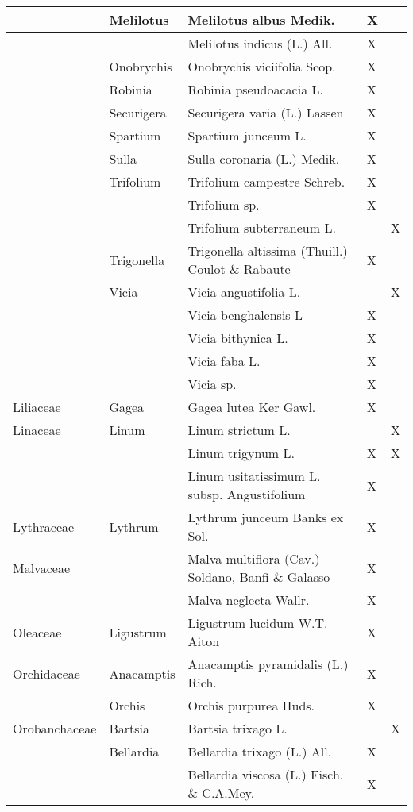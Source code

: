 \documentclass[main.tex]{subfiles}
\begin{document}
\begin{table}[!ht]
\begin{tabular}[\footnotesize]{|p{2.4cm}|p{1.9cm}|p{5.8cm}|p{1.1cm}|p{1cm}|}
        ~ & Melilotus & Melilotus albus Medik. & X & ~ \\ \hline
        ~ & ~ & Melilotus indicus (L.) All. & X & ~ \\ \hline
        ~ & Onobrychis & Onobrychis viciifolia Scop. & X & ~ \\ \hline
        ~ & Robinia & Robinia pseudoacacia L. & X & ~ \\ \hline
        ~ & Securigera & Securigera varia (L.) Lassen & X & ~ \\ \hline
        ~ & Spartium & Spartium junceum L. & X & ~ \\ \hline
        ~ & Sulla & Sulla coronaria (L.) Medik. & X & ~ \\ \hline
        ~ & Trifolium & Trifolium campestre Schreb. & X & ~ \\ \hline
        ~ & ~ & Trifolium sp. & X & ~ \\ \hline
        ~ & ~ & Trifolium subterraneum L. & ~ & X \\ \hline
        ~ & Trigonella & Trigonella altissima (Thuill.) Coulot \& Rabaute & X & ~ \\ \hline
        ~ & Vicia & Vicia angustifolia L. & ~ & X \\ \hline
        ~ & ~ & Vicia benghalensis L & X & ~ \\ \hline
        ~ & ~ & Vicia bithynica L. & X & ~ \\ \hline
        ~ & ~ & Vicia faba L. & X & ~ \\ \hline
        ~ & ~ & Vicia sp. & X & ~ \\ \hline
        Liliaceae & Gagea & Gagea lutea Ker Gawl. & X & ~ \\ \hline
        Linaceae & Linum & Linum strictum L. & ~ & X \\ \hline
        ~ & ~ & Linum trigynum L. & X & X \\ \hline
        ~ & ~ & Linum usitatissimum L. subsp. Angustifolium & X & ~ \\ \hline
        Lythraceae & Lythrum & Lythrum junceum Banks ex Sol. & X & ~ \\ \hline
        Malvaceae & ~ & Malva multiflora (Cav.) Soldano, Banfi \& Galasso & X & ~ \\ \hline
        ~ & ~ & Malva neglecta Wallr. & X & ~ \\ \hline
        Oleaceae & Ligustrum & Ligustrum lucidum W.T. Aiton & X & ~ \\ \hline
        Orchidaceae & Anacamptis & Anacamptis pyramidalis (L.) Rich. & X & ~ \\ \hline
        ~ & Orchis & Orchis purpurea Huds. & X & ~ \\ \hline
        Orobanchaceae & Bartsia & Bartsia trixago L. & ~ & X \\ \hline
        ~ & Bellardia & Bellardia trixago (L.) All. & X & ~ \\ \hline
        ~ & ~ & Bellardia viscosa (L.) Fisch. \& C.A.Mey. & X & ~ \\ \hline
        \end{tabular}
    \end{table}
    
\end{document}
